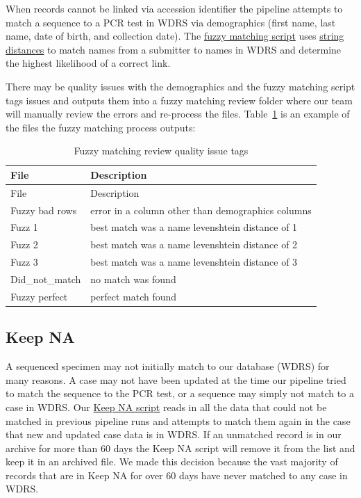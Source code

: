 \documentclass[
]{agujournal2019}
\begin{document}
When records cannot be linked via accession identifier the pipeline
attempts to match a sequence to a PCR test in WDRS via demographics
(first name, last name, date of birth, and collection date). The
\href{notebook/fuzzy.Rmd}{fuzzy matching script} uses
\href{https://github.com/markvanderloo/stringdist}{string distances} to
match names from a submitter to names in WDRS and determine the highest
likelihood of a correct link.

There may be quality issues with the demographics and the fuzzy matching
script tags issues and outputs them into a fuzzy matching review folder
where our team will manually review the errors and re-process the files.
Table~\ref{tbl-fuzzyreview} is an example of the files the fuzzy
matching process outputs:

\begin{longtable}[]{@{}ll@{}}
\caption{Fuzzy matching review quality issue
tags}\label{tbl-fuzzyreview}\tabularnewline
\toprule\noalign{}
File & Description \\
\midrule\noalign{}
\endfirsthead
\toprule\noalign{}
File & Description \\
\midrule\noalign{}
\endhead
\bottomrule\noalign{}
\endlastfoot
Fuzzy bad rows & error in a column other than demographics columns \\
Fuzz 1 & best match was a name levenshtein distance of 1 \\
Fuzz 2 & best match was a name levenshtein distance of 2 \\
Fuzz 3 & best match was a name levenshtein distance of 3 \\
Did\_not\_match & no match was found \\
Fuzzy perfect & perfect match found \\
\end{longtable}

\subsection{Keep NA}\label{sec-keepna}

A sequenced specimen may not initially match to our database (WDRS) for
many reasons. A case may not have been updated at the time our pipeline
tried to match the sequence to the PCR test, or a sequence may simply
not match to a case in WDRS. Our
\href{KEEP_NA_ROSTER_SECOND_IN_PROGRESS.Rmd}{Keep NA script} reads in
all the data that could not be matched in previous pipeline runs and
attempts to match them again in the case that new and updated case data
is in WDRS. If an unmatched record is in our archive for more than 60
days the Keep NA script will remove it from the list and keep it in an
archived file. We made this decision because the vast majority of
records that are in Keep NA for over 60 days have never matched to any
case in WDRS.
\end{document}
